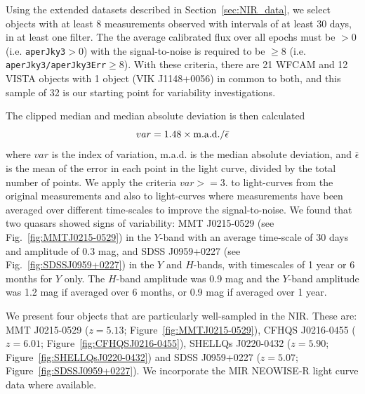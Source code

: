 \documentclass[usenatbib]{mnras}
\begin{document}
Using the extended datasets described in Section~\ref{sec:NIR_data},
we select objects with at least 8 measurements observed with intervals
of at least 30 days, in at least one filter. The the average
calibrated flux over all epochs must be $>0$ (i.e. {\tt aperJky3}$>0$)
with the signal-to-noise is required to be $\geq8$ (i.e. {\tt
aperJky3/aperJky3Err}$\geq$8). With these criteria, there are 21 WFCAM 
and 12 VISTA objects with 1 object (VIK J1148+0056) in common to both, 
and this sample of 32 is our starting
point for variability investigations.

The clipped median and median absolute deviation is then calculated
\begin{equation}
      var = 1.48 \times  {\rm m.a.d.} / \bar{\epsilon}
\end{equation}
where $var$ is the index of variation, m.a.d. is the median absolute
deviation, and $\bar{\epsilon}$ is the mean of the error in each point
in the light curve, divided by the total number of points. We apply the criteria 
$var>=3.$ to light-curves from the original measurements and also to light-curves 
where measurements have been averaged over different time-scales to improve 
the signal-to-noise. We found that two quasars showed signs of variability:
MMT J0215-0529 (see Fig.~\ref{fig:MMTJ0215-0529}) in the $Y$-band with an average time-scale of 30 days and amplitude of 0.3 mag, and 
SDSS J0959+0227 (see Fig.~\ref{fig:SDSSJ0959+0227}) in the $Y$ and $H$-bands, with timescales of 1 year or 6 months 
for $Y$ only. The $H$-band amplitude was 0.9 mag and the $Y$-band amplitude was 1.2 mag if averaged over 6 months,
or 0.9 mag if averaged over 1 year.

We present four objects that are particularly well-sampled in the NIR. 
These are: 
MMT J0215-0529       ($z=5.13$; Figure~\ref{fig:MMTJ0215-0529}), 
CFHQS J0216-0455    ($z=6.01$; Figure~\ref{fig:CFHQSJ0216-0455}), 
SHELLQs J0220-0432 ($z=5.90$; Figure~\ref{fig:SHELLQsJ0220-0432}) 
and 
SDSS J0959+0227 ($z=5.07$; Figure~\ref{fig:SDSSJ0959+0227}). 
We incorporate the MIR NEOWISE-R light curve data where available. 
\end{document}
